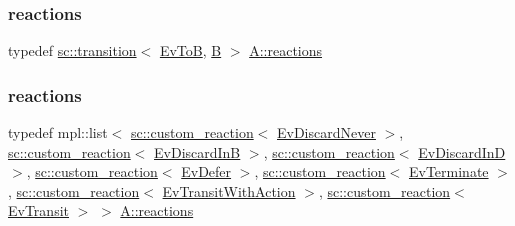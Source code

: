 \mbox{\label{struct_a_a14567593462fe87eb5c35b1c564dc869}} 
\subsubsection{\texorpdfstring{reactions}{reactions}\hspace{0.1cm}{\footnotesize\ttfamily [11/13]}}
{\footnotesize\ttfamily typedef \mbox{\hyperlink{classboost_1_1statechart_1_1transition}{sc\+::transition}}$<$ \mbox{\hyperlink{struct_ev_to_b}{Ev\+ToB}}, \mbox{\hyperlink{struct_b}{B}} $>$ \mbox{\hyperlink{struct_a_aaf7ef039e669b21e19f81777afeed659}{A\+::reactions}}}

\mbox{\label{struct_a_aaf7ef039e669b21e19f81777afeed659}} 
\subsubsection{\texorpdfstring{reactions}{reactions}\hspace{0.1cm}{\footnotesize\ttfamily [12/13]}}
{\footnotesize\ttfamily typedef mpl\+::list$<$ \mbox{\hyperlink{classboost_1_1statechart_1_1custom__reaction}{sc\+::custom\+\_\+reaction}}$<$ \mbox{\hyperlink{struct_ev_discard_never}{Ev\+Discard\+Never}} $>$, \mbox{\hyperlink{classboost_1_1statechart_1_1custom__reaction}{sc\+::custom\+\_\+reaction}}$<$ \mbox{\hyperlink{struct_ev_discard_in_b}{Ev\+Discard\+InB}} $>$, \mbox{\hyperlink{classboost_1_1statechart_1_1custom__reaction}{sc\+::custom\+\_\+reaction}}$<$ \mbox{\hyperlink{struct_ev_discard_in_d}{Ev\+Discard\+InD}} $>$, \mbox{\hyperlink{classboost_1_1statechart_1_1custom__reaction}{sc\+::custom\+\_\+reaction}}$<$ \mbox{\hyperlink{struct_ev_defer}{Ev\+Defer}} $>$, \mbox{\hyperlink{classboost_1_1statechart_1_1custom__reaction}{sc\+::custom\+\_\+reaction}}$<$ \mbox{\hyperlink{struct_ev_terminate}{Ev\+Terminate}} $>$, \mbox{\hyperlink{classboost_1_1statechart_1_1custom__reaction}{sc\+::custom\+\_\+reaction}}$<$ \mbox{\hyperlink{struct_ev_transit_with_action}{Ev\+Transit\+With\+Action}} $>$, \mbox{\hyperlink{classboost_1_1statechart_1_1custom__reaction}{sc\+::custom\+\_\+reaction}}$<$ \mbox{\hyperlink{struct_ev_transit}{Ev\+Transit}} $>$ $>$ \mbox{\hyperlink{struct_a_aaf7ef039e669b21e19f81777afeed659}{A\+::reactions}}}

\mbox{\label{struct_a_a9fdfa49e1cf1fe54c74cab8e5e690f55}} 
